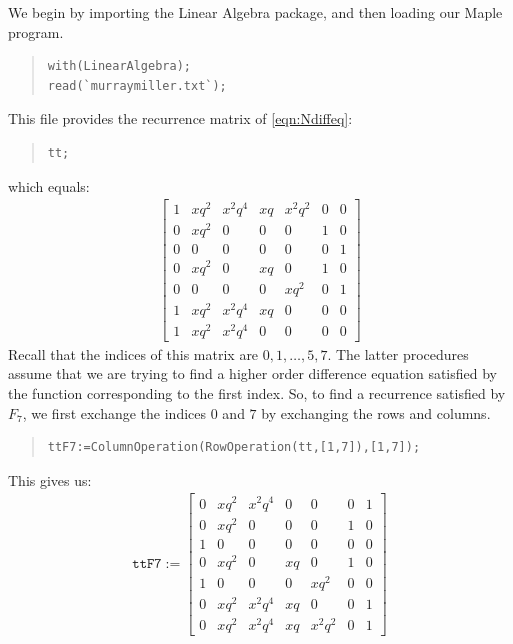 \documentclass[ALCO,Unicode,published]{cedram}
\begin{document}
We begin by importing the Linear Algebra package, and then loading our Maple program.
\begin{quote}
\begin{verbatim}
with(LinearAlgebra);
read(`murraymiller.txt`);
\end{verbatim}
\end{quote}
This file provides the recurrence matrix of \eqref{eqn:Ndiffeq}:
\begin{quote}
\begin{verbatim}
tt;
\end{verbatim}
\end{quote}
which equals:
\begin{align*}
\begin{bmatrix}
1&x{q}^{2}&{x}^{2}{q}^{4}&xq&{x}^{2}{q}^{2}&0&0\\
0&x{q}^{2}&0&0&0&1&0\\
0&0&0&0&0&0&1\\
0&x{q}^{2}&0&xq&0&1&0\\ 
0&0&0&0&x{q}^{2}&0&1\\ 
1&x{q}^{2}&{x}^{2}{q}^{4}&xq&0&0&0\\
1&x{q}^{2}&{x}^{2}{q}^{4}&0&0&0&0
\end{bmatrix} 
\end{align*}
Recall that the indices of this matrix are $0,1,\dots, 5, 7$.
The latter procedures assume that we are trying to find 
a higher order difference equation satisfied by the function corresponding
to the first index.
So, to find a recurrence satisfied by $F_7$, we first exchange the indices
$0$ and $7$ by exchanging the rows and columns.
\begin{quote}
\begin{verbatim}
ttF7:=ColumnOperation(RowOperation(tt,[1,7]),[1,7]);
\end{verbatim}
\end{quote}
This gives us:
\begin{align*}
\mathtt{ttF7}:=\begin{bmatrix} 0&x{q}^{2}&{x}^{2}{q}^{4}&0&0&0&1\\ 
0&x{q}^{2}&0&0&0&1&0\\
1&0&0&0&0&0&0\\ 
0&x{q}^{2}&0&xq&0&1&0\\ 
1&0&0&0&x{q}^{2}&0&0\\ 
0&x{q}^{2}&{x}^{2}{q}^{4}&xq&0&0&1\\ 
0&x{q}^{2}&{x}^{2}{q}^{4}&xq&{x}^{2}{q}^{2}&0&1
\end{bmatrix}
\end{align*}
\end{document}
